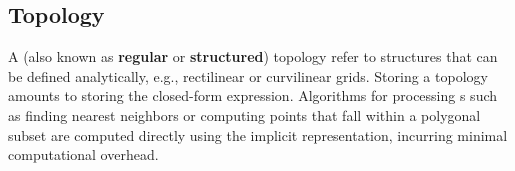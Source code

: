 \subsection{\cgrid{} Topology}
A \cgrid{} (also known as {\bf regular} or {\bf structured}) topology
refer to structures that can be defined analytically, e.g.,
rectilinear or curvilinear grids. Storing a \cgrid{} topology amounts
to storing the closed-form expression. Algorithms for processing
\cgrid{}s such as finding nearest neighbors or computing points that
fall within a polygonal subset are computed directly using the
implicit \cgrid{} representation, incurring minimal computational
overhead.
